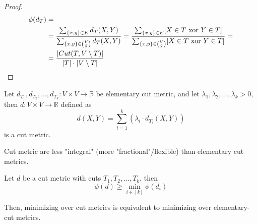     \begin{proof}


        \begin{equation*}
            \begin{split}
                \phi(d_T)   &=\\
                            &= \dfrac{\sum_{\{x,y\} \in E} d_T(X,Y)}{\sum_{\{x,y\} \in \binom{V}{2}} d_T(X,Y)} = \dfrac{\sum_{\{x,y\} \in E} [X \in T \text{ xor } Y \in T]}{\sum_{\{x,y\} \in \binom{V}{2}} [X \in T \text{ xor } Y \in T]} =\\
                            &= \dfrac{\vert Cut(T, V \setminus T) \vert}{\vert T \vert \cdot \vert V \setminus T \vert}
            \end{split}
        \end{equation*}
    \end{proof}

    \begin{definition}
        Let $d_{T_1}, d_{T_2}, \dots, d_{T_k} : V \times V \rightarrow \mathbb{R}$ be elementary cut metric, and let $\lambda_1, \lambda_2, \dots, \lambda_k > 0$, then $d : V \times V \rightarrow \mathbb{R}$ defined as
        \[ d(X,Y) = \sum_{i=1}^{k}(\lambda_i \cdot d_{T_i}(X,Y)) \]
        is a cut metric.
    \end{definition}

    Cut metric are less "integral" (more "fractional"/flexible) than elementary cut metrics.

    \begin{lemma}\label{lemma:metric3}
        Let $d$ be a cut metric with cuts $T_1, T_2, \dots, T_k$, then
        \[ \phi(d) \geq \min_{i \in [k]} \phi(d_i) \]
    \end{lemma}

    Then, minimizing over cut metrics is equivalent to minimizing over elementary-cut metrics.

